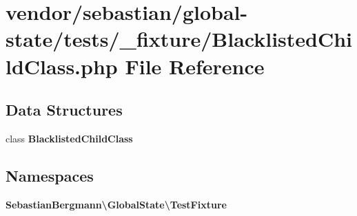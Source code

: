 \section{vendor/sebastian/global-\/state/tests/\+\_\+fixture/\+Blacklisted\+Child\+Class.php File Reference}
\label{_blacklisted_child_class_8php}
\subsection*{Data Structures}
\begin{DoxyCompactItemize}
\item 
class {\bf Blacklisted\+Child\+Class}
\end{DoxyCompactItemize}
\subsection*{Namespaces}
\begin{DoxyCompactItemize}
\item 
 {\bf Sebastian\+Bergmann\textbackslash{}\+Global\+State\textbackslash{}\+Test\+Fixture}
\end{DoxyCompactItemize}
